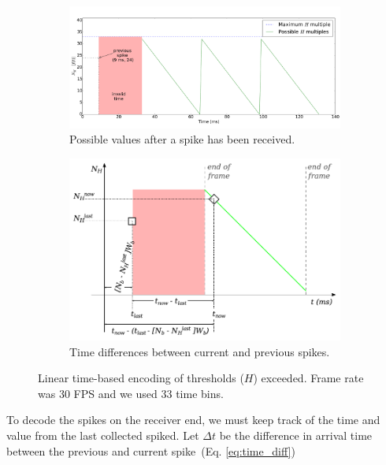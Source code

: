 \documentclass[conference]{IEEEtran}
\begin{document}
\begin{figure}[htb]
  \centering
      
    \begin{subfigure}[b]{0.45\textwidth}
      \includegraphics[width=\textwidth]{spike_values_linear}
      \caption{Possible values after a spike has been received.}
      \label{fig:linear_time_all}
    \end{subfigure}
    
    \begin{subfigure}[b]{0.45\textwidth}
      \includegraphics[width=\textwidth]{new_val_calc_linear}
      \caption{Time differences between current and previous spikes.}
      \label{fig:linear_time_calc}
    \end{subfigure}
  \caption{Linear time-based encoding of thresholds ($H$) exceeded.  Frame rate was 30 FPS and we used 33 time bins.}
  \label{fig:linear_time}
\end{figure} 

To decode the spikes on the receiver end, we must keep track of the time and value from the last collected spiked. Let $\Delta t$ be the difference in arrival time between the previous and current spike~(Eq. \ref{eq:time_diff})
\end{document}
